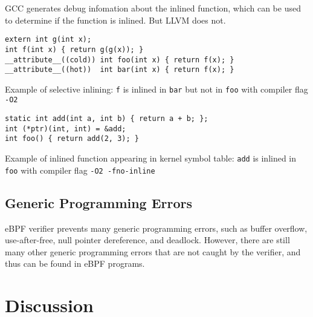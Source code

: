 GCC generates debug infomation about the inlined function, which can be used to determine if the function is inlined. But LLVM does not.


\begin{listing}[t]
  \begin{verbatim}
extern int g(int x);
int f(int x) { return g(g(x)); }
__attribute__((cold)) int foo(int x) { return f(x); }
__attribute__((hot))  int bar(int x) { return f(x); }
\end{verbatim}
  \caption{Example of selective inlining: \texttt{f} is inlined in \texttt{bar} but not in \texttt{foo} with compiler flag \texttt{-O2}}
  \label{fig:compiler_selective_inlining}
\end{listing}

\begin{listing}[t]
  \begin{verbatim}
static int add(int a, int b) { return a + b; };
int (*ptr)(int, int) = &add;
int foo() { return add(2, 3); }
\end{verbatim}
  \caption{Example of inlined function appearing in kernel symbol table: \texttt{add} is inlined in \texttt{foo} with compiler flag \texttt{-O2 -fno-inline}}
  \label{fig:compiler_inlined_in_symbol_table}
\end{listing}

\subsection{Generic Programming Errors}
eBPF verifier prevents many generic programming errors, such as buffer overflow, use-after-free, null pointer dereference, and deadlock.
However, there are still many other generic programming errors that are not caught by the verifier, and thus can be found in eBPF programs.


\section{Discussion}
